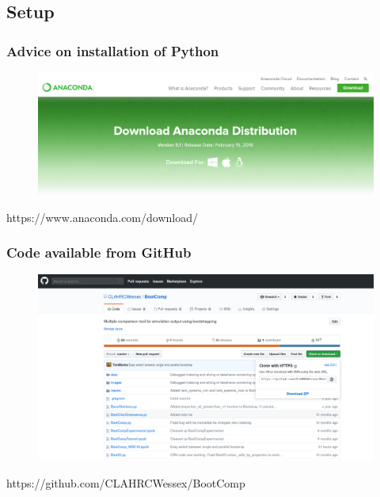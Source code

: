 \documentclass[aspectratio=169]{beamer}
\begin{document}
\subsection{Setup} 

\begin{frame}
\frametitle{Advice on installation of Python}
\begin{figure}
\includegraphics[width=1.0\linewidth]{anaconda.png}
\end{figure}
https://www.anaconda.com/download/
\end{frame}




\begin{frame}
\frametitle{Code available from GitHub}
\begin{figure}
\includegraphics[width=0.95\linewidth]{github.png}
\end{figure}
https://github.com/CLAHRCWessex/BootComp
\end{frame}
\end{document}
